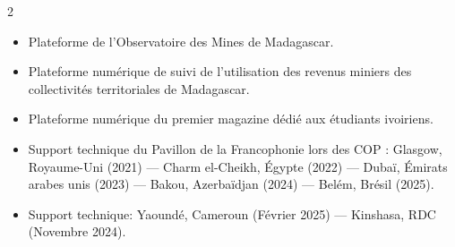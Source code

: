 \documentclass[10pt,a4paper,ragged2e,withhyper]{altacv}
\begin{document}
\begin{paracol}{2}
            \begin{itemize}
                \item Plateforme de l'Observatoire des Mines de Madagascar.
            \end{itemize}
            \divider

            \newpage

            \begin{itemize}
                \item Plateforme numérique de suivi de l'utilisation des revenus miniers des collectivités territoriales de Madagascar.
            \end{itemize}
            \divider

            \begin{itemize}
                \item Plateforme numérique du premier magazine dédié aux étudiants ivoiriens.
            \end{itemize}


            \begin{itemize}
                \item Support technique du Pavillon de la Francophonie lors des COP : Glasgow, Royaume-Uni (2021) — Charm el-Cheikh, Égypte (2022) — Dubaï, Émirats arabes unis (2023) — Bakou, Azerbaïdjan (2024) — Belém, Brésil (2025).
            \end{itemize}
            \divider

            \begin{itemize}
                \item Support technique: Yaoundé, Cameroun (Février 2025) — Kinshasa, RDC (Novembre 2024).
            \end{itemize}


\end{paracol}
\end{document}
